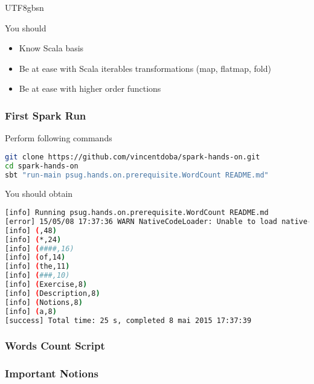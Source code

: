 \documentclass[slidetop,9pt,utf8]{beamer}
\begin{document}
\begin{CJK}{UTF8}{gbsn}
\begin{frame}
  \begin{block}{You should}
    \begin{itemize}
      \item Know Scala basis
      \item Be at ease with Scala iterables transformations (map, flatmap, fold)
      \item Be at ease with higher order functions
    \end{itemize}
  \end{block}

\end{frame}

\begin{frame}[fragile]
  \frametitle{First Spark Run}

  \begin{block}{Perform following commands}
    \begin{lstlisting}[language=bash, style=terminal]
git clone https://github.com/vincentdoba/spark-hands-on.git
cd spark-hands-on
sbt "run-main psug.hands.on.prerequisite.WordCount README.md" 
    \end{lstlisting}
  \end{block}

  \begin{block}{You should obtain}
    \begin{lstlisting}[language=bash, style=terminal]
[info] Running psug.hands.on.prerequisite.WordCount README.md
[error] 15/05/08 17:37:36 WARN NativeCodeLoader: Unable to load native-hadoop library for your platform... using builtin-java classes where applicable
[info] (,48)
[info] (*,24)
[info] (####,16)
[info] (of,14)
[info] (the,11)
[info] (###,10)
[info] (Exercise,8)
[info] (Description,8)
[info] (Notions,8)
[info] (a,8)
[success] Total time: 25 s, completed 8 mai 2015 17:37:39
    \end{lstlisting}
  \end{block}

\end{frame}

\begin{frame}[fragile]
  \frametitle{Words Count Script}

  

\end{frame}

\begin{frame}
  \frametitle{Important Notions}


\end{frame}
\end{CJK}
\end{document}
